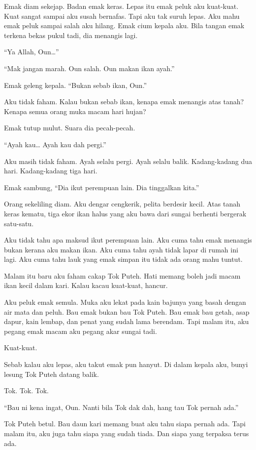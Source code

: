 \documentclass[
  11pt,
  a5paper,
  openany,
  oneside]{book}
\begin{document}
Emak diam sekejap. Badan emak keras. Lepas itu emak peluk aku kuat-kuat.
Kuat sangat sampai aku susah bernafas. Tapi aku tak suruh lepas. Aku
mahu emak peluk sampai salah aku hilang. Emak cium kepala aku. Bila
tangan emak terkena bekas pukul tadi, dia menangis lagi.

``Ya Allah, Oun\ldots''

``Mak jangan marah. Oun salah. Oun makan ikan ayah.''

Emak geleng kepala. ``Bukan sebab ikan, Oun.''

Aku tidak faham. Kalau bukan sebab ikan, kenapa emak menangis atas
tanah? Kenapa semua orang muka macam hari hujan?

Emak tutup mulut. Suara dia pecah-pecah.

``Ayah kau\ldots{} Ayah kau dah pergi.''

Aku masih tidak faham. Ayah selalu pergi. Ayah selalu balik.
Kadang-kadang dua hari. Kadang-kadang tiga hari.

Emak sambung, ``Dia ikut perempuan lain. Dia tinggalkan kita.''

Orang sekeliling diam. Aku dengar cengkerik, pelita berdesir kecil. Atas
tanah keras kematu, tiga ekor ikan halus yang aku bawa dari sungai
berhenti bergerak satu-satu.

Aku tidak tahu apa maksud ikut perempuan lain. Aku cuma tahu emak
menangis bukan kerana aku makan ikan. Aku cuma tahu ayah tidak lapar di
rumah ini lagi. Aku cuma tahu lauk yang emak simpan itu tidak ada orang
mahu tuntut.

Malam itu baru aku faham cakap Tok Puteh. Hati memang boleh jadi macam
ikan kecil dalam kari. Kalau kacau kuat-kuat, hancur.

Aku peluk emak semula. Muka aku lekat pada kain bajunya yang basah
dengan air mata dan peluh. Bau emak bukan bau Tok Puteh. Bau emak bau
getah, asap dapur, kain lembap, dan penat yang sudah lama berendam. Tapi
malam itu, aku pegang emak macam aku pegang akar sungai tadi.

Kuat-kuat.

Sebab kalau aku lepas, aku takut emak pun hanyut. Di dalam kepala aku,
bunyi lesung Tok Puteh datang balik.

Tok. Tok. Tok.

``Bau ni kena ingat, Oun. Nanti bila Tok dak dah, hang tau Tok pernah
ada.''

Tok Puteh betul. Bau daun kari memang buat aku tahu siapa pernah ada.
Tapi malam itu, aku juga tahu siapa yang sudah tiada. Dan siapa yang
terpaksa terus ada.
\end{document}
